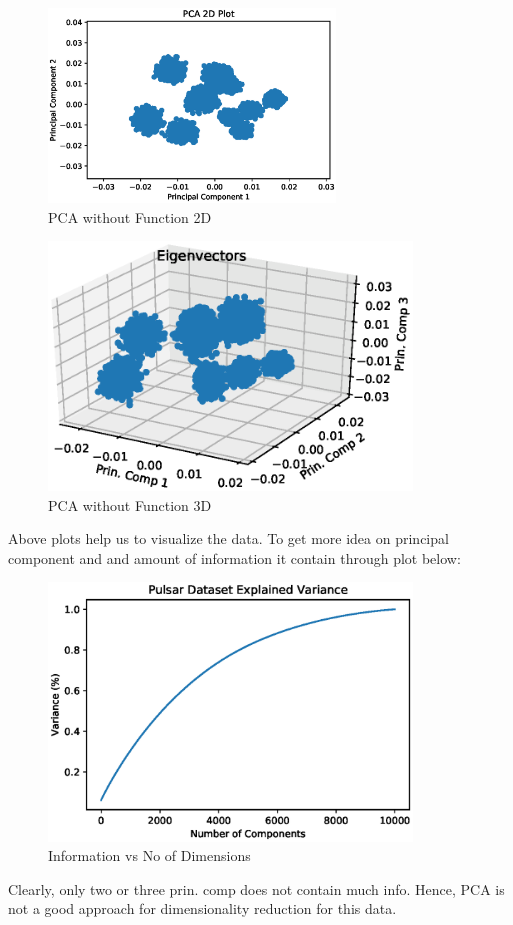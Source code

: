 \documentclass[journal,12pt,twocolumn]{IEEEtran}
\begin{document}
\begin{figure}[!h]
\begin{center}
\includegraphics[width=3in]{./figs/PCA_2D_woFun.eps}
\end{center}
\caption{PCA without Function 2D}
\label{fig: 2D Plot}
\end{figure}

\begin{figure}[!h]
\begin{center}
\includegraphics[width=3.8in]{./figs/PCA_3D_woFun.eps}
\end{center}
\caption{PCA without Function 3D}
\label{fig: 3D Plot}
\end{figure}

Above plots help us to visualize the data. To get more idea on principal component and and amount of information it contain through plot below:

\begin{figure}[!h]
\begin{center}
\includegraphics[width=3.8in]{./figs/Accuray.eps}
\end{center}
\caption{Information vs No of Dimensions }
\label{fig: }
\end{figure}  

Clearly, only two or three prin. comp does not contain much info. Hence, PCA is not a good approach for dimensionality reduction for this data.
\end{document}

